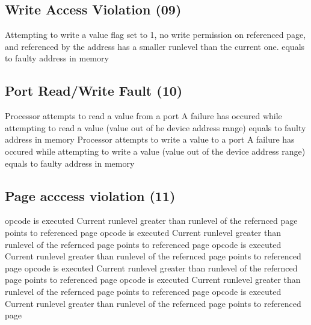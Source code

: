 \subsection{Write Access Violation (09)}
           {Attempting to write a value}
           { flag set to 1, no write permission on referenced page, and referenced by the address has a smaller runlevel than the current one.}
           { equals to faulty address in memory}


\subsection{Port Read/Write Fault (10)}
           {Processor attempts to read a value from a port}
           {A failure has occured while attempting to read a value (value out of he device address range)}
           { equals to faulty address in memory}
           {Processor attempts to write a value to a port}
           {A failure has occured while attempting to write a value (value out of the device address range)}
           { equals to faulty address in memory}


\subsection{Page acccess violation (11)}
           { opcode is executed}
           {Current runlevel greater than runlevel of the refernced page}
           { points to referenced page}
           { opcode is executed}
           {Current runlevel greater than runlevel of the refernced page}
           { points to referenced page}
           { opcode is executed}
           {Current runlevel greater than runlevel of the refernced page}
           { points to referenced page}
           { opcode is executed}
           {Current runlevel greater than runlevel of the refernced page}
           { points to referenced page}
           { opcode is executed}
           {Current runlevel greater than runlevel of the refernced page}
           { points to referenced page}
           { opcode is executed}
           {Current runlevel greater than runlevel of the refernced page}
           { points to referenced page}


